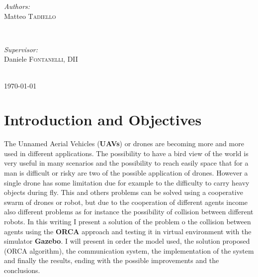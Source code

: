 \documentclass[11pt,twocolumn]{article}
\begin{document}
\begin{titlepage}

\begin{minipage}{0.4\textwidth}
\begin{flushleft} \large
\emph{Authors:}\\
Matteo \textsc{Tadiello} %
\end{flushleft}
\end{minipage}
~
\begin{minipage}{0.4\textwidth}
\begin{flushright} \large
\emph{Supervisor:} \\
Daniele \textsc{Fontanelli, DII} %
\end{flushright}
\end{minipage}\\[2cm]


{\large \today}\\[0.5cm] %



\vfill %

\end{titlepage}

\section{Introduction and Objectives}

The Unnamed Aerial Vehicles (\textbf{UAVs}) or drones are becoming more and more used in different applications. The possibility to have a bird view of the world is very useful in many scenarios and the possibility to reach easily space that for a man is difficult or risky are two of the possible application of drones. However a single drone has some limitation due for example to the difficulty to carry heavy objects during fly. This and others problems can be solved using a cooperative swarm of drones or robot, but due to the cooperation of different agents income also different problems as for instance the possibility of collision between different robots. In this writing I present a solution of the problem o the collision between agents using the \textbf{ORCA} approach and testing it in virtual environment with the simulator \textbf{Gazebo}. I will present in order the model used, the solution proposed (ORCA algorithm), the communication system, the implementation of the system and finally the results, ending with the possible improvements and the conclusions.
\end{document}

